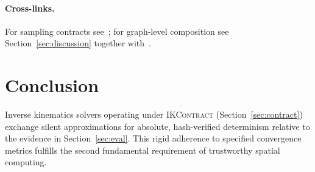 \documentclass[sigconf,nonacm]{acmart}
\newcommand{\ikcontract}{\textsc{IKContract}}
\begin{document}
\paragraph{Cross-links.}
For sampling contracts see~\cite{paper-6-anim-sca2027}; for graph-level
composition see Section~\ref{sec:discussion} together with~\cite{paper-8-unified-siggraph2027}.

\section{Conclusion}
\label{sec:conclusion}

Inverse kinematics solvers operating under \ikcontract{} (Section~\ref{sec:contract}) exchange silent approximations for absolute, hash-verified determinism relative to the evidence in Section~\ref{sec:eval}. This rigid adherence to specified convergence metrics fulfills the second fundamental requirement of trustworthy spatial computing.



\end{document}
